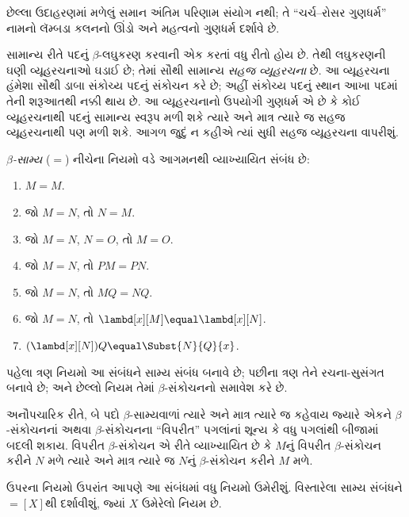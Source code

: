 છેલ્લા ઉદાહરણમાં મળેલું સમાન અંતિમ પરિણામ સંયોગ નથી;
તે ``ચર્ચ--રોસર ગુણધર્મ'' નામનો લૅમ્બડા કલનનો ઊંડો
અને મહત્વનો ગુણધર્મ દર્શાવે છે.

\begin{digress}
  સામાન્ય રીતે પદનું $\beta$-લઘુકરણ કરવાની એક કરતાં
  વધુ રીતો હોય છે. તેથી લઘુકરણની ઘણી વ્યૂહરચનાઓ
  ઘડાઈ છે; તેમાં સૌથી સામાન્ય \emph{સહજ વ્યૂહરચના} છે.
  આ વ્યૂહરચના હંમેશા સૌથી ડાબા સંકોચ્ય પદનું સંકોચન કરે
  છે; અહીં સંકોચ્ય પદનું સ્થાન આખા પદમાં તેની શરૂઆતથી
  નક્કી થાય છે. આ વ્યૂહરચનાનો ઉપયોગી ગુણધર્મ એ છે કે
  કોઈ વ્યૂહરચનાથી પદનું સામાન્ય સ્વરૂપ મળી શકે ત્યારે
  અને માત્ર ત્યારે જ સહજ વ્યૂહરચનાથી પણ મળી શકે.
  આગળ જુદું ન કહીએ ત્યાં સુધી સહજ વ્યૂહરચના વાપરીશું.
\end{digress}

\begin{defn}
  \emph{$\beta$-સામ્ય} ($\equal$) નીચેના નિયમો વડે
  આગમનથી વ્યાખ્યાયિત સંબંધ છે:
  \begin{enumerate}
  \item $M \equal M$.
  \item જો $M \equal N$, તો $N \equal M$.
  \item જો $M \equal N$, $N \equal O$, તો $M \equal O$.
  \item જો $M \equal N$, તો $PM \equal PN$.
  \item જો $M \equal N$, તો $MQ \equal NQ$.
  \item જો $M \equal N$, તો $\lambd[x][M] \equal \lambd[x][N]$.
  \item $(\lambd[x][N])Q \equal \Subst{N}{Q}{x}$.
  \end{enumerate}
\end{defn}

પહેલા ત્રણ નિયમો આ સંબંધને સામ્ય સંબંધ બનાવે છે;
પછીના ત્રણ તેને રચના-સુસંગત બનાવે છે; અને છેલ્લો નિયમ
તેમાં $\beta$-સંકોચનનો સમાવેશ કરે છે.

અનૌપચારિક રીતે, બે પદો $\beta$-સામ્યવાળાં ત્યારે અને
માત્ર ત્યારે જ કહેવાય જ્યારે એકને $\beta$-સંકોચનનાં
અથવા $\beta$-સંકોચનના ``વિપરીત'' પગલાંનાં શૂન્ય કે
વધુ પગલાંથી બીજામાં બદલી શકાય. વિપરીત $\beta$-સંકોચન
એ રીતે વ્યાખ્યાયિત છે કે $M$નું વિપરીત $\beta$-સંકોચન કરીને
$N$ મળે ત્યારે અને માત્ર ત્યારે જ $N$નું $\beta$-સંકોચન
કરીને $M$ મળે.

ઉપરના નિયમો ઉપરાંત આપણે આ સંબંધમાં વધુ નિયમો ઉમેરીશું.
વિસ્તારેલા સામ્ય સંબંધને $\equal[X]$થી દર્શાવીશું,
જ્યાં $X$ ઉમેરેલો નિયમ છે.
\endgroup


\begingroup
\makeatletter{}\makeatother

